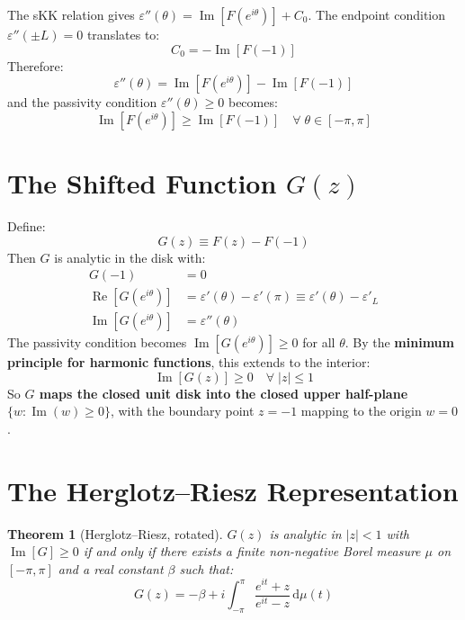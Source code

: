 \documentclass[11pt]{article}
\newtheorem{theorem}{Theorem}
\newcommand{\eps}{\varepsilon}
\newcommand{\dd}{\mathrm{d}}
\begin{document}
The sKK relation gives $\eps''(\theta) = \operatorname{Im}[F(e^{i\theta})] + C_0$.  The endpoint condition $\eps''(\pm L) = 0$ translates to:
\begin{equation}
C_0 = -\operatorname{Im}[F(-1)]
\end{equation}
Therefore:
\begin{equation}
\eps''(\theta) = \operatorname{Im}[F(e^{i\theta})] - \operatorname{Im}[F(-1)]
\end{equation}
and the passivity condition $\eps''(\theta) \geq 0$ becomes:
\begin{equation}\label{eq:passivity-disk}
\boxed{\operatorname{Im}[F(e^{i\theta})] \geq \operatorname{Im}[F(-1)] \quad \forall\;\theta \in [-\pi,\pi]}
\end{equation}

\section{The Shifted Function $G(z)$}

Define:
\begin{equation}
G(z) \equiv F(z) - F(-1)
\end{equation}
Then $G$ is analytic in the disk with:
\begin{align}
G(-1) &= 0 \\
\operatorname{Re}[G(e^{i\theta})] &= \eps'(\theta) - \eps'(\pi) \equiv \eps'(\theta) - \eps'_L \\
\operatorname{Im}[G(e^{i\theta})] &= \eps''(\theta)
\end{align}
The passivity condition becomes $\operatorname{Im}[G(e^{i\theta})] \geq 0$ for all $\theta$.  By the \textbf{minimum principle for harmonic functions}, this extends to the interior:
\begin{equation}
\operatorname{Im}[G(z)] \geq 0 \quad \forall\;|z| \leq 1
\end{equation}
So \textbf{$G$ maps the closed unit disk into the closed upper half-plane} $\{w : \operatorname{Im}(w) \geq 0\}$, with the boundary point $z = -1$ mapping to the origin $w = 0$.

\section{The Herglotz--Riesz Representation}

\begin{theorem}[Herglotz--Riesz, rotated]\label{thm:herglotz}
$G(z)$ is analytic in $|z| < 1$ with $\operatorname{Im}[G] \geq 0$ if and only if there exists a finite non-negative Borel measure $\mu$ on $[-\pi, \pi]$ and a real constant $\beta$ such that:
\begin{equation}
G(z) = -\beta + i\int_{-\pi}^{\pi} \frac{e^{it} + z}{e^{it} - z}\,\dd\mu(t)
\end{equation}
\end{theorem}
\end{document}
